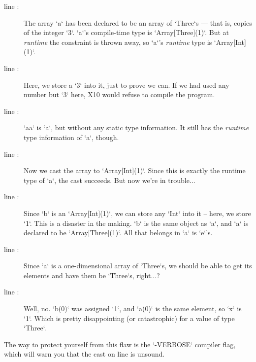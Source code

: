 \begin{description}

\item [line :] The array \xcd`a` has been declared to be
      an array of \xcd`Three`s --- that is, copies of the integer \xcd`3`.
      \xcd`a`'s compile-time type is \xcd`Array[Three](1)`.  But at {\em
      runtime} the constraint is thrown away, so \xcd`a`'s {\em runtime} type
      is \xcd`Array[Int](1)`. 

\item [line :] 
      Here, we store a \xcd`3` into it, just to prove we can.  If we had used
      any number but \xcd`3` here, X10 would refuse to compile the program.

\item [line :] \xcd`aa` is \xcd`a`, but without any
      static type information.  It still has the {\em runtime} type
      information of \xcd`a`, though.

\item [line :] Now we cast the array to \xcd`Array[Int](1)`.
      Since this is exactly the runtime type of \xcd`a`, the cast succeeds.
      But now we're in trouble...

\item [line :] Since \xcd`b` is an \xcd`Array[Int](1)`,
      we can store any \xcd`Int` into it -- here, we store \xcd`1`.  This is a
      disaster in the making. \xcd`b` is the same object as \xcd`a`, and
      \xcd`a` is declared to be \xcd`Array[Three](1)`. All that belongs in
      \xcd`a` is \xcd`e`'s. 

\item [line :] Since \xcd`a` is a
      one-dimensional array of \xcd`Three`s, we should be able to get its
      elements and have them be \xcd`Three`s, right...?  

\item [line :] Well, no.  \xcd`b(0)` was assigned
      \xcd`1`, and \xcd`a(0)` is the same element, so \xcd`x` is \xcd`1`.
      Which is pretty disappointing (or catastrophic) for a value of type
      \xcd`Three`. 
\end{description}

The way to protect yourself from this flaw is the \xcd`-VERBOSE` compiler
flag, which will warn you that the cast on line  is unsound.  




